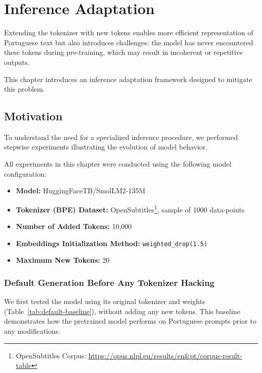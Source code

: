 \chapter{Inference Adaptation}
\label{chap:inference_adaptation}

Extending the tokenizer with new tokens enables more efficient representation of Portuguese text but also introduces challenges: the model has never encountered these tokens during pre-training, which may result in incoherent or repetitive outputs.

This chapter introduces an inference adaptation framework designed to mitigate this problem.

\section{Motivation}

To understand the need for a specialized inference procedure, we performed stepwise experiments illustrating the evolution of model behavior.

All experiments in this chapter were conducted using the following model configuration:
\begin{itemize}
    \item \textbf{Model:} HuggingFaceTB/SmolLM2-135M
    \item \textbf{Tokenizer (BPE) Dataset:} OpenSubtitles\footnote{OpenSubtitles Corpus: \url{https://opus.nlpl.eu/results/en&pt/corpus-result-table}}, sample of 1000 data-points
    \item \textbf{Number of Added Tokens:} 10,000
    \item \textbf{Embeddings Initialization Method:} \texttt{weighted\_drop(1.5)}
    \item \textbf{Maximum New Tokens:} 20
\end{itemize}


\subsection{Default Generation Before Any Tokenizer Hacking}
We first tested the model using its original tokenizer and weights (Table~\ref{tab:default-baseline}), without adding any new tokens. This baseline demonstrates how the pretrained model performs on Portuguese prompts prior to any modifications.

